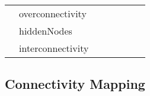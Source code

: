\begin{table}[]
{\begin{tabular}{lllllll}
                                                                                             & overconnectivity   &                                                                                   &                                                                             &                                                                                 &                                                                          & ~\cite{RN77}                  \\
                                                                                             & hiddenNodes        &                                                                                   &                                                                             &                                                                                 &                                                                          &                               \\
                                                                                             & interconnectivity  &                                                                                   &                                                                             &                                                                                 &                                                                          & ~\cite{RN78}                  \\ \hline
\end{tabular}%
}
\end{table}

\subsection{Connectivity Mapping} %
\label{sub:connectivitymapping}

